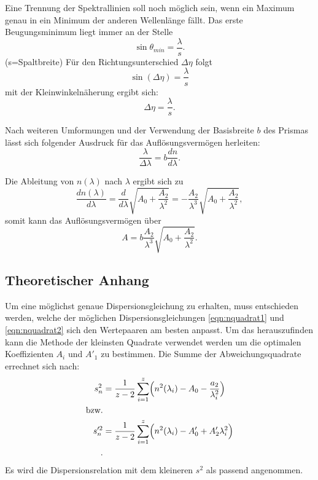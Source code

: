 Eine Trennung der Spektrallinien soll noch möglich sein, wenn ein Maximum
genau in ein Minimum der anderen Wellenlänge fällt.
Das erste Beugungsminimum liegt immer an der Stelle
\begin{equation}
  \sin{\theta_{min}}=\frac{\lambda}{s}.
\end{equation}
(s=Spaltbreite)
Für den Richtungsunterschied $\Delta\eta$ folgt
\begin{equation}
  \sin({\Delta\eta})=\frac{\lambda}{s}
  \label{sineta}
\end{equation}
mit der Kleinwinkelnäherung ergibt sich:
\begin{equation}
  \Delta \eta =\frac{\lambda}{s}.
  \label{deltaeta}
\end{equation}

Nach weiteren Umformungen und der Verwendung der Basisbreite $b$ des
Prismas lässt sich folgender Ausdruck für das Auflösungsvermögen
herleiten:
\begin{equation}
  \frac{\lambda}{\Delta \lambda}=b\frac{dn}{d\lambda}.
  \label{eqn:auflösungsvermögen}
\end{equation}

Die Ableitung von $n(\lambda)$ nach $\lambda$ ergibt sich zu
\begin{equation}
  \frac{dn(\lambda)}{d\lambda}=\frac{d}{d\lambda}\sqrt{A_0+\frac{A_2}{\lambda^2}}
  =-\frac{A_2}{\lambda^3}\sqrt{A_0+\frac{A_2}{\lambda^2}},
\end{equation}
somit kann das Auflösungsvermögen über
\begin{equation}
  A=b\frac{A_2}{\lambda^3}{\sqrt{A_0+\frac{A_2}{\lambda^2}}}.
  \label{eqn:auflösungsver}
\end{equation}

\subsection{Theoretischer Anhang}
Um eine möglichst genaue Dispersionsgleichung zu erhalten, muss
entschieden werden, welche der möglichen Dispersionsgleichungen
\ref{eqn:nquadrat1} und \ref{eqn:nquadrat2} sich den Wertepaaren
am besten anpasst. Um das herauszufinden kann die Methode der
kleinsten Quadrate verwendet werden um die optimalen Koeffizienten
$A_i$ und $A'_1$ zu bestimmen.
Die Summe der Abweichungsquadrate errechnet sich nach:
\begin{align}
  s_{n}^{2}&=\frac{1}{z-2}\sum_{i=1}^{z} \Bigl(n^2(\lambda_i)-A_0-\frac{a_2}{\lambda_{i}^{2}}\Bigr) \\
  \text{bzw.}\\
  s_{n}'^{2}&=\frac{1}{z-2}\sum_{i=1}^{z} \Bigl(n^2(\lambda_i)-A'_0+A'_{2}\lambda_{i}^{2}\Bigr) \\.
  \label{eqn:abweichungquadrat}
\end{align}
Es wird die Dispersionsrelation mit dem kleineren $s^2$ als passend angenommen.

